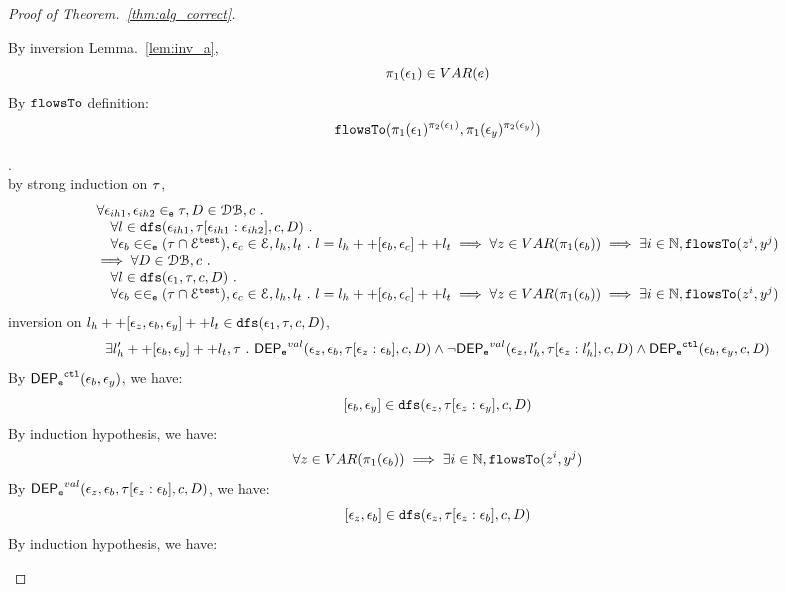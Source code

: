 \documentclass[a4paper,11pt]{article}
\begin{document}
\begin{proof}[Proof of Theorem.~\ref{thm:alg_correct}]
\begin{case}
\begin{subcase}
\begin{subsubcase}
\[\]
By inversion Lemma.~\ref{lem:inv_a}, 
\[
  \pi_1(\mathtt{\epsilon}_1) \in VAR(e)
\]
%
By $\mathtt{flowsTo}$ definition:
\[
  \mathtt{flowsTo}(\pi_1(\mathtt{\epsilon}_1)^{\pi_2(\mathtt{\epsilon}_1)}, \pi_1(\mathtt{\epsilon}_y)^{\pi_2(\mathtt{\epsilon}_y)})
\]
%
\end{subsubcase}
%
\end{subcase}
%
\begin{subcase}.
\\
by strong induction on $\mathtt{\tau}$,
\[
\begin{array}{l}
  \forall \mathtt{\epsilon}_{ih1}, \mathtt{\epsilon}_{ih2} \in_{\mathtt{e}} \mathtt{\tau}, D \in \mathcal{DB} , c ~.~
  \\ \quad 
   \forall l \in \mathtt{dfs}(\mathtt{\epsilon}_{ih1}, \mathtt{\tau}[\mathtt{\epsilon}_{ih1}:\mathtt{\epsilon}_{ih2}], c, D) ~.~
   \\ \quad 
   \forall \mathtt{\epsilon}_b \in \in_{\mathtt{e}} (\mathtt{\tau} \cap \mathcal{E}^{\mathtt{{test}}}), \mathtt{\epsilon}_c \in \mathcal{E}, l_h, l_t ~.~ 
   l = l_h ++ [ \mathtt{\epsilon}_b, \mathtt{\epsilon}_c] ++ l_t 
   \implies \forall z \in VAR(\pi_1(\mathtt{\epsilon}_b)) \implies \exists i \in \mathbb{N}, \mathtt{flowsTo}(z^i, y^j)
   \\
   \implies
   \forall D \in \mathcal{DB} , c ~.~
  \\ \quad 
   \forall l \in \mathtt{dfs}(\mathtt{\epsilon}_1, \mathtt{\tau}, c, D) ~.~
   \\ \quad 
   \forall \mathtt{\epsilon}_b \in \in_{\mathtt{e}} (\mathtt{\tau} \cap \mathcal{E}^{\mathtt{{test}}}), \mathtt{\epsilon}_c \in \mathcal{E}, l_h, l_t ~.~ 
   l = l_h ++ [ \mathtt{\epsilon}_b, \mathtt{\epsilon}_c] ++ l_t 
   \implies \forall z \in VAR(\pi_1(\mathtt{\epsilon}_b)) \implies \exists i \in \mathbb{N}, \mathtt{flowsTo}(z^i, y^j)
\end{array}
\]
inversion on  $l_h ++ {[\mathtt{\epsilon}_z,  \mathtt{\epsilon}_b, \mathtt{\epsilon}_y]} ++ l_t \in \mathtt{dfs}(\mathtt{\epsilon}_1, \mathtt{\tau}, c, D)$, 
\[
  \exists l_{h}' ++ [\mathtt{\epsilon}_b, \mathtt{\epsilon}_y] ++ l_t, \mathtt{\tau} ~.~
  \mathsf{DEP_{\mathtt{e}}}^{val}(\mathtt{\epsilon}_z, \mathtt{\epsilon}_b, \mathtt{\tau}[\mathtt{\epsilon}_z: \mathtt{\epsilon}_b], c, D)
  \land 
  \neg \mathsf{DEP_{\mathtt{e}}}^{val} (\mathtt{\epsilon}_z, l_h', \mathtt{\tau}[\mathtt{\epsilon}_z: l_h'], c, D)
  \land 
  \mathsf{DEP_{\mathtt{e}}}^{\mathtt{{ctl}}} (\mathtt{\epsilon}_b, \mathtt{\epsilon}_y, c, D)
\]
%
By $\mathsf{DEP_{\mathtt{e}}}^{\mathtt{{ctl}}} (\mathtt{\epsilon}_b, \mathtt{\epsilon}_y) $, we have:
\[
  [\mathtt{\epsilon}_b, \mathtt{\epsilon}_y]\in \mathtt{dfs}(\mathtt{\epsilon}_{z}, \mathtt{\tau}[\mathtt{\epsilon}_{z}:\mathtt{\epsilon}_{y}], c, D)
\]
%
By induction hypothesis, we have:
\begin{equation}
\label{ih_ctl}
  \forall z \in VAR(\pi_1(\mathtt{\epsilon}_b)) \implies \exists i \in \mathbb{N}, \mathtt{flowsTo}(z^i, y^j)
\end{equation}
%
By $\mathsf{DEP_{\mathtt{e}}}^{val}(\mathtt{\epsilon}_z, \mathtt{\epsilon}_b, \mathtt{\tau}[\mathtt{\epsilon}_z: \mathtt{\epsilon}_b], c, D)$, we have:
\[
  [\mathtt{\epsilon}_z, \mathtt{\epsilon}_b]\in \mathtt{dfs}(\mathtt{\epsilon}_{z}, \mathtt{\tau}[\mathtt{\epsilon}_{z}:\mathtt{\epsilon}_{b}], c, D)
\]
%
By induction hypothesis, we have:

\end{subcase}
\end{case}
\end{proof}
\end{document}

